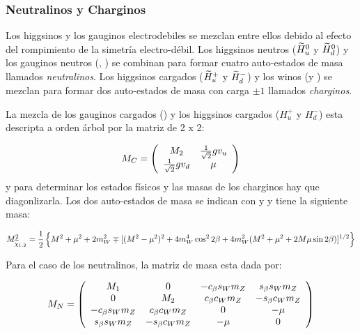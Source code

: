 \subsubsection{Neutralinos y Charginos}\label{sec:mass_NC}

Los higgsinos y los gauginos electrodebiles se mezclan entre ellos
debido al efecto del rompimiento de la simetría electro-débil. Los
higgsinos neutros ($\widetilde{H}_u^0$ y $\widetilde{H}_d^0$) y los gauginos
neutros (\bino, \winozero) se combinan para formar cuatro auto-estados
de masa llamados \emph{neutralinos}. Los higgsinos cargados
($\widetilde{H}_u^+$ y $\widetilde{H}_d^-$) y los winos (\winop y \winom) se
mezclan para formar dos auto-estados de masa con carga $\pm 1$
llamados \emph{charginos}.

La mezcla de los gauginos cargados (\winopm) y los higgsinos cargados
($H_u^+$ y $H_d^-$) esta descripta a orden árbol por la matriz de 2 x
2:

\begin{equation}
  M_{C} = \left(
  \begin{array}{cc}
    M_{2} & \frac{1}{\sqrt{2}} g v_u \\ \frac{1}{\sqrt{2}} g v_d & \mu
    \\
  \end{array}
  \right)
\end{equation}
%
y para determinar los estados físicos y las masas de los charginos hay
que diagonlizarla. Los dos auto-estados de masa se indican con
{\chinoonepm} y {\chinotwopm} y tiene la siguiente masa:

\begin{equation}
  M^2_{\widetilde{\chi}_{1,2}} = \frac{1}{2} \left\{ M^2 + \mu^2 + 2 m_W^2
  \mp [(M^2-\mu^2)^2 + 4 m_W^4 \cos^2 2\beta + 4 m_W^2 (M^2+\mu^2 + 2
    M \mu \sin 2\beta)]^{1/2} \right\}
\end{equation}



Para el caso de los neutralinos, la matriz de masa esta dada por:

\begin{equation}
  M_{N} = \left(
  \begin{array}{cccc}
    M_{1} & 0 & -c_\beta s_W m_Z & s_\beta s_W m_Z \\ 0 & M_{2} &
    c_\beta c_W m_Z & -s_\beta c_W m_Z \\

    -c_\beta s_W m_Z & c_\beta c_W m_Z & 0 & -\mu \\ s_\beta s_W m_Z &
    -s_\beta c_W m_Z & -\mu & 0 \\
  \end{array}
  \right)
\end{equation}


